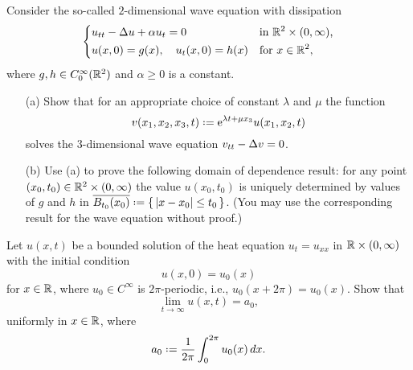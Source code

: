\begin{problem}
  Consider the so-called \(2\)-dimensional wave equation with dissipation
  \[
    \left\{
      \begin{aligned}
        &u_{tt}-\Delta u+\alpha u_t=0&&\text{in \(\mathbb{R}^2\times(0,\infty)\),}\\
        &u(x,0)=g(x),\quad u_t(x,0)=h(x)&&\text{for \(x\in\mathbb{R}^2\),}
      \end{aligned}
    \right.
  \]
  where \(g,h\in C_0^\infty(\mathbb{R}^2)\) and \(\alpha\geq 0\) is a constant.
  \begin{itemize}[noitemsep]
  \item[(a)] Show that for an appropriate choice of constant \(\lambda\)
    and \(\mu\) the function
    \[
      v(x_1,x_2,x_3,t)\defeq \rme^{\lambda t+\mu x_3}u(x_1,x_2,t)
    \]
    solves the \(3\)-dimensional wave equation \(v_{tt}-\Delta v=0\).
  \item[(b)] Use (a) to prove the following domain of dependence result:
    for any point \((x_0,t_0)\in\mathbb{R}^2\times(0,\infty)\) the value
    \(u(x_0,t_0)\) is uniquely determined by values of \(g\) and \(h\) in
    \(\overline{B_{t_0}(x_0)}\defeq\{\,|x-x_0|\leq t_0\,\}\). (You may use
    the corresponding result for the wave equation without proof.)
  \end{itemize}
\end{problem}
\begin{solution*}
\end{solution*}

\begin{problem}
  Let \(u(x,t)\) be a bounded solution of the heat equation \(u_t=u_{xx}\)
  in \(\mathbb{R}\times(0,\infty)\) with the initial condition
  \[
    u(x,0)=u_0(x)
  \]
  for \(x\in\mathbb{R}\), where \(u_0\in C^\infty\) is \(2\pi\)-periodic, i.e.,
  \(u_0(x+2\pi)=u_0(x)\). Show that
  \[
    \lim_{t\to\infty} u(x,t)=a_0,
  \]
  uniformly in \(x\in\mathbb{R}\), where
  \[
    a_0\defeq\frac{1}{2\pi}\int_0^{2\pi} u_0(x)\diff x.
  \]
\end{problem}
\begin{solution*}
\end{solution*}

